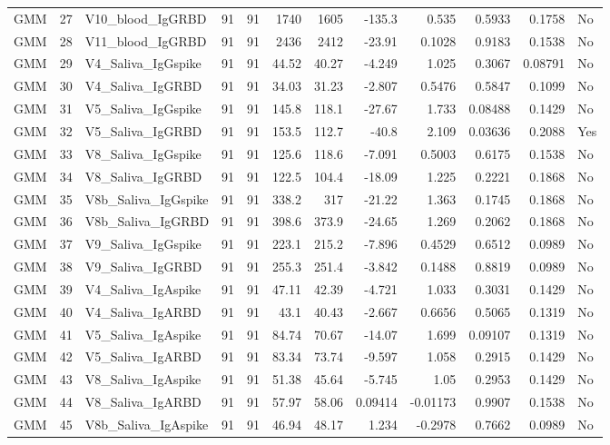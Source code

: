 \begin{longtable}{lrp{}rrrrrrrrl}
GMM & 27 & V10\_blood\_IgGRBD & 91 & 91 & 1740 & 1605 & -135.3 & 0.535 & 0.5933 & 0.1758 & No \\
GMM & 28 & V11\_blood\_IgGRBD & 91 & 91 & 2436 & 2412 & -23.91 & 0.1028 & 0.9183 & 0.1538 & No \\
GMM & 29 & V4\_Saliva\_IgGspike & 91 & 91 & 44.52 & 40.27 & -4.249 & 1.025 & 0.3067 & 0.08791 & No \\
GMM & 30 & V4\_Saliva\_IgGRBD & 91 & 91 & 34.03 & 31.23 & -2.807 & 0.5476 & 0.5847 & 0.1099 & No \\
GMM & 31 & V5\_Saliva\_IgGspike & 91 & 91 & 145.8 & 118.1 & -27.67 & 1.733 & 0.08488 & 0.1429 & No \\
GMM & 32 & V5\_Saliva\_IgGRBD & 91 & 91 & 153.5 & 112.7 & -40.8 & 2.109 & 0.03636 & 0.2088 & Yes \\
GMM & 33 & V8\_Saliva\_IgGspike & 91 & 91 & 125.6 & 118.6 & -7.091 & 0.5003 & 0.6175 & 0.1538 & No \\
GMM & 34 & V8\_Saliva\_IgGRBD & 91 & 91 & 122.5 & 104.4 & -18.09 & 1.225 & 0.2221 & 0.1868 & No \\
GMM & 35 & V8b\_Saliva\_IgGspike & 91 & 91 & 338.2 & 317 & -21.22 & 1.363 & 0.1745 & 0.1868 & No \\
GMM & 36 & V8b\_Saliva\_IgGRBD & 91 & 91 & 398.6 & 373.9 & -24.65 & 1.269 & 0.2062 & 0.1868 & No \\
GMM & 37 & V9\_Saliva\_IgGspike & 91 & 91 & 223.1 & 215.2 & -7.896 & 0.4529 & 0.6512 & 0.0989 & No \\
GMM & 38 & V9\_Saliva\_IgGRBD & 91 & 91 & 255.3 & 251.4 & -3.842 & 0.1488 & 0.8819 & 0.0989 & No \\
GMM & 39 & V4\_Saliva\_IgAspike & 91 & 91 & 47.11 & 42.39 & -4.721 & 1.033 & 0.3031 & 0.1429 & No \\
GMM & 40 & V4\_Saliva\_IgARBD & 91 & 91 & 43.1 & 40.43 & -2.667 & 0.6656 & 0.5065 & 0.1319 & No \\
GMM & 41 & V5\_Saliva\_IgAspike & 91 & 91 & 84.74 & 70.67 & -14.07 & 1.699 & 0.09107 & 0.1319 & No \\
GMM & 42 & V5\_Saliva\_IgARBD & 91 & 91 & 83.34 & 73.74 & -9.597 & 1.058 & 0.2915 & 0.1429 & No \\
GMM & 43 & V8\_Saliva\_IgAspike & 91 & 91 & 51.38 & 45.64 & -5.745 & 1.05 & 0.2953 & 0.1429 & No \\
GMM & 44 & V8\_Saliva\_IgARBD & 91 & 91 & 57.97 & 58.06 & 0.09414 & -0.01173 & 0.9907 & 0.1538 & No \\
GMM & 45 & V8b\_Saliva\_IgAspike & 91 & 91 & 46.94 & 48.17 & 1.234 & -0.2978 & 0.7662 & 0.0989 & No \\

\end{longtable}

